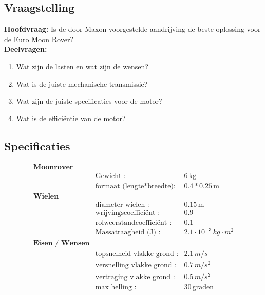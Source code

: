 \subsection{Vraagstelling}
\textbf{Hoofdvraag:}
Is de door Maxon voorgestelde aandrijving de beste oplossing voor de Euro Moon Rover?\\
\textbf{Deelvragen:}
\begin{enumerate}
    \item Wat zijn de lasten en wat zijn de wensen?
    \item Wat is de juiste mechanische transmissie?
    \item Wat zijn de juiste specificaties voor de motor?
    \item Wat is de efficiëntie van de motor?
\end{enumerate}

\subsection{Specificaties}
\begin{align*}
  \textbf{Moonrover}\\
  &\text{Gewicht :} & 6 \, \text{kg} \\
  &\text{formaat (lengte*breedte):} & 0.4*0.25 \, \text{m}\\
  \textbf{Wielen}\\
  &\text{diameter wielen :} & 0.15 \, \text{m}\\
  &\text{wrijvingscoefficiënt :} & 0.9 \, \\
  &\text{rolweerstandcoefficiënt :} & 0.1 \, \\
  &\text{Massatraagheid (J) :} & \text{$2.1 \cdot 10^{-3}$} \, \text{$kg \cdot m^{2}$}\\
  \textbf{Eisen / Wensen}\\
  &\text{topsnelheid vlakke grond :} & 2.1 \, \text{$m/s$}\\
  &\text{versnelling vlakke grond :} & 0.7 \, \text{$m/s^{2}$}\\
  &\text{vertraging vlakke grond :} & 0.5 \, \text{$m/s^{2}$}\\
  &\text{max helling :} & 30 \, \text{graden}
\end{align*}
\cite{canvas}